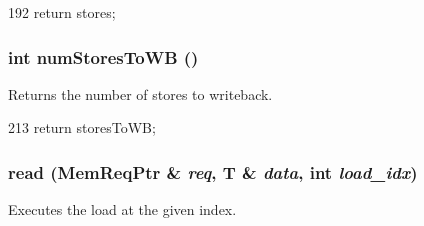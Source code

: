 \begin{DoxyCode}
192 { return stores; }
\end{DoxyCode}
\hypertarget{classOzoneLSQ_a276cdbdaf4551f1b846c4e2535c5f882}{
\subsubsection[{numStoresToWB}]{\setlength{\rightskip}{0pt plus 5cm}int numStoresToWB ()}}
\label{classOzoneLSQ_a276cdbdaf4551f1b846c4e2535c5f882}
Returns the number of stores to writeback. 


\begin{DoxyCode}
213 { return storesToWB; }
\end{DoxyCode}
\hypertarget{classOzoneLSQ_ad2981b6704bca036af0723daaaebe57e}{
\subsubsection[{read}]{ read (MemReqPtr \& {\em req}, \/  T \& {\em data}, \/  int {\em load\_\-idx})}}
\label{classOzoneLSQ_ad2981b6704bca036af0723daaaebe57e}
Executes the load at the given index. 


